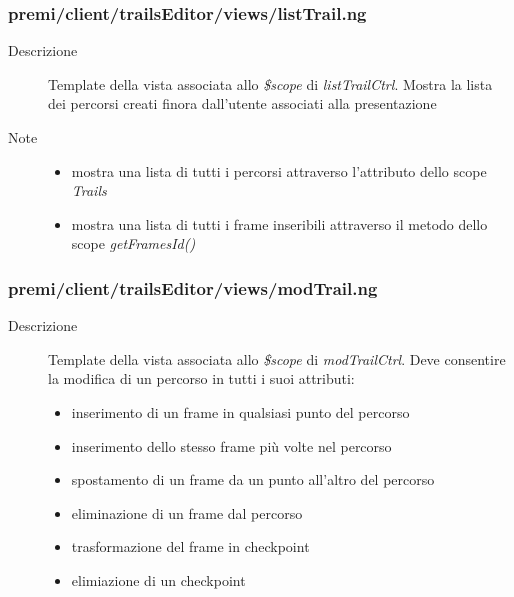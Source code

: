 \subsubsection{premi/client/trailsEditor/views/listTrail.ng}

\begin{description}
\item[Descrizione] \hfill
	Template della vista associata allo \textit{\$scope} di \textit{listTrailCtrl}. Mostra la lista dei percorsi creati finora dall'utente associati alla presentazione
\item[Note] \hfill
	\begin{itemize}
			\item mostra una lista di tutti i percorsi attraverso l'attributo dello scope \textit{Trails}
			\item mostra una lista di tutti i frame inseribili attraverso il metodo dello scope \textit{getFramesId()}
	\end{itemize}
\end{description}

\subsubsection{premi/client/trailsEditor/views/modTrail.ng}

\begin{description}
\item[Descrizione] \hfill
	Template della vista associata allo \textit{\$scope} di \textit{modTrailCtrl}. Deve consentire la modifica di un percorso in tutti i suoi attributi:
	\begin{itemize}
			\item inserimento di un frame in qualsiasi punto del percorso
			\item inserimento dello stesso frame più volte nel percorso
						\item spostamento di un frame da un punto all'altro del percorso
			\item eliminazione di un frame dal percorso
			\item trasformazione del frame in checkpoint
			\item elimiazione di un checkpoint
	\end{itemize}
\end{description}

